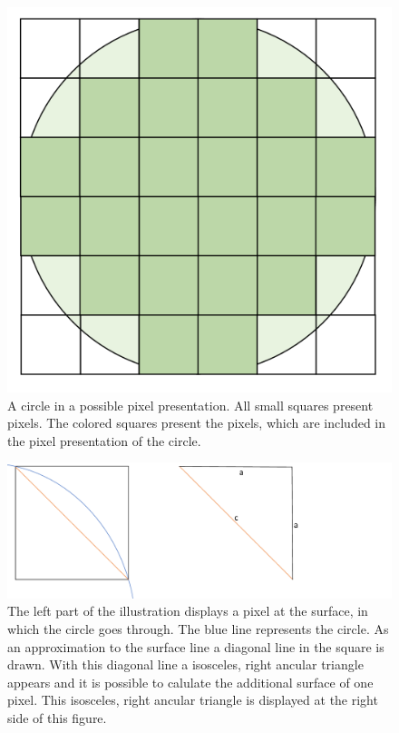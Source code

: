 \begin{figure}
	\center
	\includegraphics[scale=0.15]{figures/PixelCircleSquare.png}
	\caption{A circle in a possible pixel presentation. All small squares present pixels. The colored squares present the pixels, which are included in the pixel presentation of the circle.}
	\label{img:CircleSquarePixels}
\end{figure}

\begin{figure}
	\center
	\includegraphics[scale=0.3]{figures/SurfaceApproximationSQRT2.png}
	\caption{The left part of the illustration displays a pixel at the surface, in which the circle goes through. The blue line represents the circle. As an approximation to the surface line a diagonal line in the square is drawn. With this diagonal line a isosceles, right ancular triangle appears and it is possible to calulate the additional surface of one pixel. This isosceles, right ancular triangle is displayed at the right side of this figure.}
	\label{img:ApproximationSQRT2}
\end{figure}

